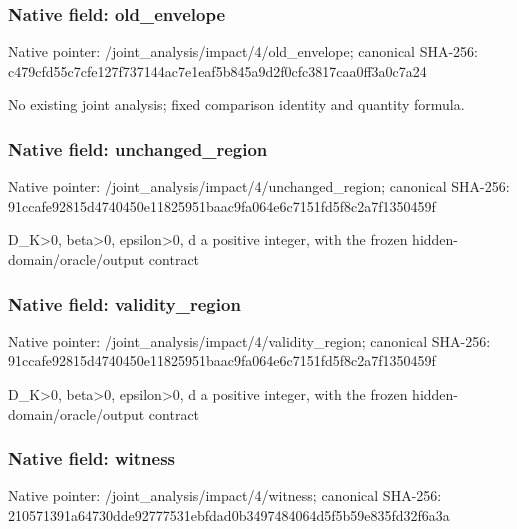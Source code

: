 \documentclass[10pt,a4paper]{article}
\begin{document}
\subsubsection{Native field: old\_\allowbreak{}envelope}
Native pointer: /joint\_\allowbreak{}analysis/impact/4/old\_\allowbreak{}envelope; canonical SHA-256: c479cfd55c7cfe127f737144ac7e1eaf5b845a9d2f0cfc3817caa0ff3a0c7a24

\begingroup\raggedright\sloppy No existing joint analysis;\allowbreak{} fixed comparison identity and quantity formula.\par\endgroup

\subsubsection{Native field: unchanged\_\allowbreak{}region}
Native pointer: /joint\_\allowbreak{}analysis/impact/4/unchanged\_\allowbreak{}region; canonical SHA-256: 91ccafe92815d4740450e11825951baac9fa064e6c7151fd5f8c2a7f1350459f

\begingroup\raggedright\sloppy D\_\allowbreak{}K>0,\allowbreak{} beta>0,\allowbreak{} epsilon>0,\allowbreak{} d a positive integer,\allowbreak{} with the frozen hidden-domain/\allowbreak{}oracle/\allowbreak{}output contract\par\endgroup

\subsubsection{Native field: validity\_\allowbreak{}region}
Native pointer: /joint\_\allowbreak{}analysis/impact/4/validity\_\allowbreak{}region; canonical SHA-256: 91ccafe92815d4740450e11825951baac9fa064e6c7151fd5f8c2a7f1350459f

\begingroup\raggedright\sloppy D\_\allowbreak{}K>0,\allowbreak{} beta>0,\allowbreak{} epsilon>0,\allowbreak{} d a positive integer,\allowbreak{} with the frozen hidden-domain/\allowbreak{}oracle/\allowbreak{}output contract\par\endgroup

\subsubsection{Native field: witness}
Native pointer: /joint\_\allowbreak{}analysis/impact/4/witness; canonical SHA-256: 210571391a64730dde92777531ebfdad0b3497484064d5f5b59e835fd32f6a3a
\end{document}
